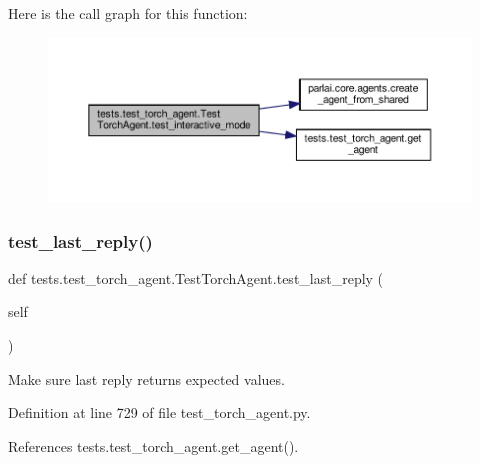 Here is the call graph for this function\+:
\nopagebreak
\begin{figure}[H]
\begin{center}
\leavevmode
\includegraphics[width=350pt]{classtests_1_1test__torch__agent_1_1TestTorchAgent_aadf263b222e27bfd83d568148683a8e0_cgraph}
\end{center}
\end{figure}
\mbox{\label{classtests_1_1test__torch__agent_1_1TestTorchAgent_a7c1c12023294608a146271f4fe1574ea}} 
\subsubsection{\texorpdfstring{test\+\_\+last\+\_\+reply()}{test\_last\_reply()}}
{\footnotesize\ttfamily def tests.\+test\+\_\+torch\+\_\+agent.\+Test\+Torch\+Agent.\+test\+\_\+last\+\_\+reply (\begin{DoxyParamCaption}\item[{}]{self }\end{DoxyParamCaption})}

\begin{DoxyVerb}Make sure last reply returns expected values.\end{DoxyVerb}
 

Definition at line 729 of file test\+\_\+torch\+\_\+agent.\+py.



References tests.\+test\+\_\+torch\+\_\+agent.\+get\+\_\+agent().


